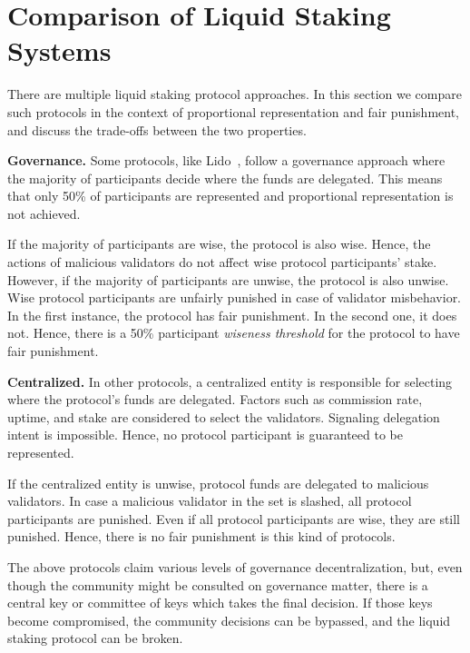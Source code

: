 \section{Comparison of Liquid Staking Systems}

There are multiple liquid staking protocol approaches. In this section we
compare such protocols in the context of proportional representation
and fair punishment, and discuss the trade-offs between the
two properties.

\textbf{Governance.}
Some protocols, like Lido~\cite{lido}, follow a governance approach
where the majority of participants decide where the funds are
delegated. This means that only 50\% of participants are
represented and proportional representation is not achieved.

If the majority of participants are
wise, the protocol is also wise. Hence, the actions of malicious validators
do not affect wise protocol participants' stake.
However, if the majority of participants are unwise, the protocol is
also unwise. Wise protocol participants are unfairly punished in case
of validator misbehavior.
In the first instance, the protocol has fair punishment. In the
second one, it does not. Hence, there is a 50\% participant
\emph{wiseness threshold} for the protocol to have fair punishment.

\textbf{Centralized.}
In other protocols, a centralized entity is responsible for
selecting where the protocol's funds are delegated.
Factors such as commission rate,
uptime, and stake are considered to select the validators.
Signaling delegation intent is impossible. Hence, no protocol
participant is guaranteed to be represented.

If the centralized entity is unwise, protocol funds are
delegated to malicious validators. In case a malicious validator in the
set is slashed, all protocol participants are punished. Even if all
protocol participants are wise, they are still punished.
Hence, there is no fair punishment is this kind of protocols.

The above protocols claim various levels of governance decentralization,
but, even though the community might be consulted on governance matter,
there is a central key or committee of keys which takes the final decision.
If those keys become compromised, the community decisions can be bypassed, and
the liquid staking protocol can be broken.



